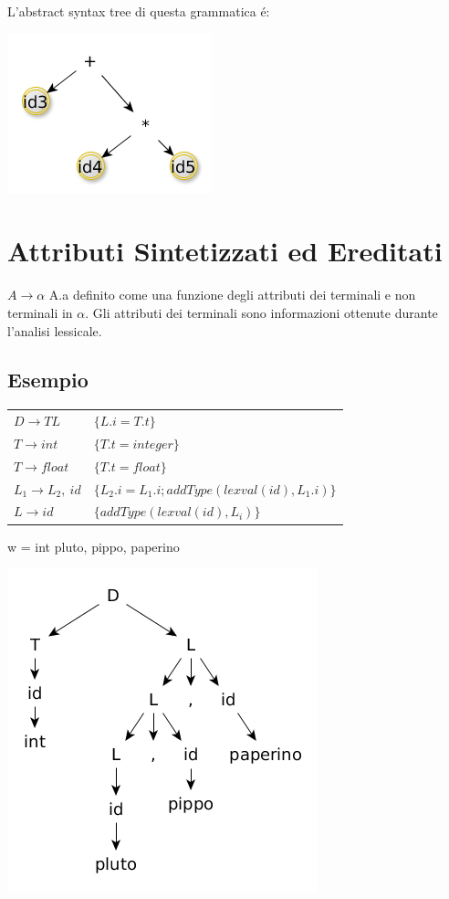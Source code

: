 L'abstract syntax tree di questa grammatica \'e:

\begin{center}
    \includegraphics[scale=0.6]{Chapters/Img/c05_09.png}\\
\end{center}

\section{Attributi Sintetizzati ed Ereditati}
$A \rightarrow \alpha$ A.a definito come una funzione degli attributi dei terminali e non terminali in $\alpha$. Gli attributi dei terminali sono informazioni ottenute 
durante l'analisi lessicale.

\subsection{Esempio}
\begin{tabular}{ll}
	$D \rightarrow TL$ 			&	$ \{ L.i = T.t \} $\\
	$T \rightarrow int$ 		&	$ \{ T.t = integer \} $\\
	$T \rightarrow float $ 		&	$ \{ T.t = float \} $\\
	$L_1 \rightarrow L_2,\ id$ 	&	$ \{ L_2.i = L_1.i; addType(lexval(id), L_1.i) \} $\\
	$L \rightarrow id$ 			&	$ \{ addType(lexval(id), L_i) \} $\\
\end{tabular}

w = int pluto, pippo, paperino 

\begin{center}
    \includegraphics[scale=0.6]{Chapters/Img/c05_10.png}\\
\end{center}

